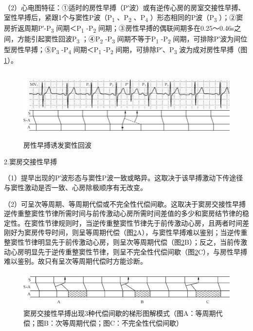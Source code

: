 （2）心电图特征：①适时的房性早搏（P′波）或有逆传心房的房室交接性早搏、室性早搏后，紧跟1个与窦性P波（P\textsubscript{1}
、P\textsubscript{2} 、P\textsubscript{4}
）形态相同的P波（P\textsubscript{3}
）；②窦房折返周期P′-P\textsubscript{3} 间期＜P\textsubscript{1}
-P\textsubscript{2}
间期；③房性早搏的偶联间期多在0.25～0.46s之间，方能引起窦性回波P\textsubscript{3}
；④P\textsubscript{2} -P\textsubscript{3} 间期不等于P\textsubscript{1}
-P\textsubscript{2}
间期，可排除P′波为间位型房性早搏；⑤P\textsubscript{3}
-P\textsubscript{4} 间期＜P\textsubscript{1} -P\textsubscript{2}
间期，可排除P′、P\textsubscript{3} 波为成对房性早搏（图\ref{fig1-19}）。

\begin{figure}[!htbp]
 \centering
 \includegraphics[width=5.73958in,height=1.41667in]{./images/Image00025.jpg}
 \captionsetup{justification=centering}
 \caption{房性早搏诱发窦性回波}
 \label{fig1-19}
  \end{figure} 

2.窦房交接性早搏

（1）提早出现的P′波形态与窦性P波一致或略异。这取决于该早搏激动下传途径与窦性激动是否一致、心房除极顺序有无改变。

（2）可呈次等周期、等周期代偿或不完全性代偿间歇。这取决于窦房交接性早搏逆传重整窦性节律所需时间与前传激动心房所需时间差值的多少和窦房结节律的稳定性。在窦性节律规则时，当逆传重整窦性节律先于前传激动心房，且两者时间差刚好为窦房传导时间，则呈等周期代偿（图\ref{fig1-20}A），与窦性早搏难以鉴别；当逆传重整窦性节律明显先于前传激动心房，则呈次等周期代偿（图\ref{fig1-20}B）；反之，当前传激动心房明显先于逆传重整窦性节律，则呈不完全性代偿间歇（图\ref{fig1-20}C），与房性早搏难以鉴别。故只有呈次等周期代偿时方能诊断。

\begin{figure}[!htbp]
 \centering
 \includegraphics[width=5.5625in,height=0.71875in]{./images/Image00026.jpg}
 \captionsetup{justification=centering}
 \caption{窦房交接性早搏出现3种代偿间歇的梯形图解模式（图A：等周期代偿；图B：次等周期代偿；图C：不完全性代偿间歇）}
 \label{fig1-20}
  \end{figure} 

